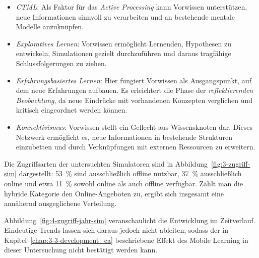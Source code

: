 \begin{itemize}
    \item \textit{\acs{CTML}}: Als Faktor für das \textit{Active Processing} kann Vorwissen unterstützen, neue Informationen sinnvoll zu verarbeiten und an bestehende mentale Modelle anzuknüpfen.
    \item \textit{Exploratives Lernen}: Vorwissen ermöglicht Lernenden, Hypothesen zu entwickeln, Simulationen gezielt durchzuführen und daraus tragfähige Schlussfolgerungen zu ziehen.
    \item \textit{Erfahrungsbasiertes Lernen}: Hier fungiert Vorwissen als Ausgangspunkt, auf dem neue Erfahrungen aufbauen. Es erleichtert die Phase der \textit{reflektierenden Beobachtung}, da neue Eindrücke mit vorhandenen Konzepten verglichen und kritisch eingeordnet werden können.
    \item \textit{Konnektivismus}: Vorwissen stellt ein Geflecht aus Wissensknoten dar. Dieses Netzwerk ermöglicht es, neue Informationen in bestehende Strukturen einzubetten und durch Verknüpfungen mit externen Ressourcen zu erweitern.
\end{itemize}

Die Zugriffsarten der untersuchten Simulatoren sind in Abbildung~\ref{fig:3-zugriff-sim} dargestellt: 53~\% sind ausschließlich offline nutzbar, 37~\% ausschließlich online und etwa 11~\% sowohl online als auch offline verfügbar. Zählt man die hybride Kategorie den Online-Angeboten zu, ergibt sich insgesamt eine annähernd ausgeglichene Verteilung.

Abbildung~\ref{fig:4-zugriff-jahr-sim} veranschaulicht die Entwicklung im Zeitverlauf. Eindeutige Trends lassen sich daraus jedoch nicht ableiten, sodass der in Kapitel~\ref{chap:3-3-development_ca} beschriebene Effekt des Mobile Learning in dieser Untersuchung nicht bestätigt werden kann.

